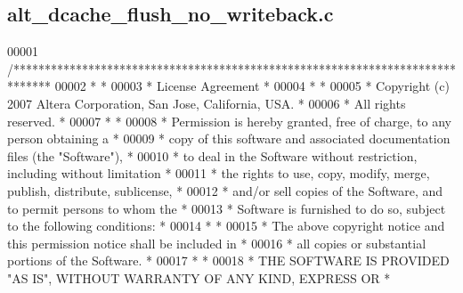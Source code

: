 \subsection{alt\+\_\+dcache\+\_\+flush\+\_\+no\+\_\+writeback.\+c}
\label{alt__dcache__flush__no__writeback_8c_source}

\begin{DoxyCode}
00001 \textcolor{comment}{/******************************************************************************}
00002 \textcolor{comment}{*                                                                             *}
00003 \textcolor{comment}{* License Agreement                                                           *}
00004 \textcolor{comment}{*                                                                             *}
00005 \textcolor{comment}{* Copyright (c) 2007 Altera Corporation, San Jose, California, USA.           *}
00006 \textcolor{comment}{* All rights reserved.                                                        *}
00007 \textcolor{comment}{*                                                                             *}
00008 \textcolor{comment}{* Permission is hereby granted, free of charge, to any person obtaining a     *}
00009 \textcolor{comment}{* copy of this software and associated documentation files (the "Software"),  *}
00010 \textcolor{comment}{* to deal in the Software without restriction, including without limitation   *}
00011 \textcolor{comment}{* the rights to use, copy, modify, merge, publish, distribute, sublicense,    *}
00012 \textcolor{comment}{* and/or sell copies of the Software, and to permit persons to whom the       *}
00013 \textcolor{comment}{* Software is furnished to do so, subject to the following conditions:        *}
00014 \textcolor{comment}{*                                                                             *}
00015 \textcolor{comment}{* The above copyright notice and this permission notice shall be included in  *}
00016 \textcolor{comment}{* all copies or substantial portions of the Software.                         *}
00017 \textcolor{comment}{*                                                                             *}
00018 \textcolor{comment}{* THE SOFTWARE IS PROVIDED "AS IS", WITHOUT WARRANTY OF ANY KIND, EXPRESS OR  *}

\end{DoxyCode}

